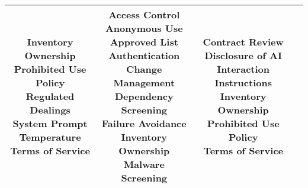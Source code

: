 \documentclass[fleqn]{article}
\begin{document}
\begin{table}[H]
\begin{tabular}{|c|c|c|c|}
{			\textbullet\hspace{3pt} Inventory\\ 	
			\textbullet\hspace{3pt} Ownership\\ 	
			\textbullet\hspace{3pt} Prohibited Use Policy\\ 	
			\textbullet\hspace{3pt} Regulated Dealings\\ 	
			\textbullet\hspace{3pt} System Prompt\\ 	
			\textbullet\hspace{3pt} Temperature\\ 	
			\textbullet\hspace{3pt} Terms of Service\\ 	
		}
		& \makecell[l]{ 	
			\textbullet\hspace{3pt} Access Control\\ 	
			\textbullet\hspace{3pt} Anonymous Use\\ 	
			\textbullet\hspace{3pt} Approved List\\ 	
			\textbullet\hspace{3pt} Authentication\\ 	
			\textbullet\hspace{3pt} Change Management\\ 	
			\textbullet\hspace{3pt} Dependency Screening\\ 	
			\textbullet\hspace{3pt} Failure Avoidance\\ 	
			\textbullet\hspace{3pt} Inventory\\ 	
			\textbullet\hspace{3pt} Ownership\\ 	
			\textbullet\hspace{3pt} Malware Screening\\ 	
		} 
		& \makecell[l]{ 	
			\textbullet\hspace{3pt} Contract Review\\ 	
			\textbullet\hspace{3pt} Disclosure of AI Interaction\\ 	
			\textbullet\hspace{3pt} Instructions\\ 	
			\textbullet\hspace{3pt} Inventory\\ 	
			\textbullet\hspace{3pt} Ownership\\ 	
			\textbullet\hspace{3pt} Prohibited Use Policy\\ 	
			\textbullet\hspace{3pt} Terms of Service\\ 	
		} \\
		\hline
	\end{tabular}
	\label{table:low_risk_plan_by_gai_risk_cont2}
\end{table}
\end{document}
